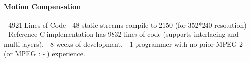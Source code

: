 


\paragraph*{Motion Compensation}


- 4921 Lines of Code
- 48 static streams compile to 2150 (for 352*240 resolution)
- Reference C implementation has 9832 lines of code (supports interlacing and multi-layers).
- 8 weeks of development.
- 1 programmer with no prior MPEG-2 (or MPEG : - ) experience.







